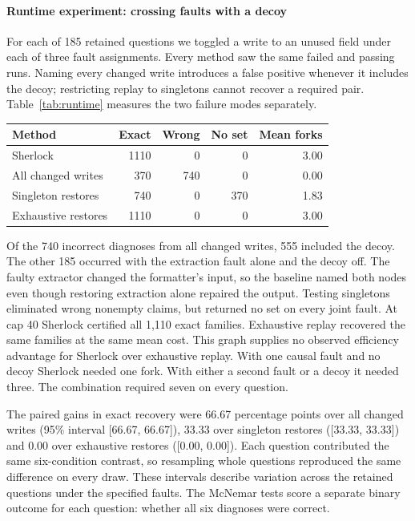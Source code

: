 \documentclass[11pt,letterpaper]{article}
\begin{document}
\paragraph{Runtime experiment: crossing faults with a decoy}\label{sec:runtime}
For each of 185 retained questions we toggled a write to an unused field under each of three fault assignments. Every method saw the same failed and passing runs. Naming every changed write introduces a false positive whenever it includes the decoy; restricting replay to singletons cannot recover a required pair. Table~\ref{tab:runtime} measures the two failure modes separately.

\begin{center}\begin{minipage}{\linewidth}\centering
{}\label{tab:runtime}
\small\begin{tabular}{lrrrr}
\toprule
Method & Exact & Wrong & No set & Mean forks \\
\midrule
Sherlock & 1110 & 0 & 0 & 3.00 \\
All changed writes & 370 & 740 & 0 & 0.00 \\
Singleton restores & 740 & 0 & 370 & 1.83 \\
Exhaustive restores & 1110 & 0 & 0 & 3.00 \\
\bottomrule\end{tabular}
\end{minipage}\end{center}

Of the 740 incorrect diagnoses from all changed writes, 555 included the decoy. The other 185 occurred with the extraction fault alone and the decoy off. The faulty extractor changed the formatter's input, so the baseline named both nodes even though restoring extraction alone repaired the output. Testing singletons eliminated wrong nonempty claims, but returned no set on every joint fault. At cap 40 Sherlock certified all 1,110 exact families. Exhaustive replay recovered the same families at the same mean cost. This graph supplies no observed efficiency advantage for Sherlock over exhaustive replay. With one causal fault and no decoy Sherlock needed one fork. With either a second fault or a decoy it needed three. The combination required seven on every question.

The paired gains in exact recovery were 66.67 percentage points over all changed writes (95\% interval [66.67, 66.67]), 33.33 over singleton restores ([33.33, 33.33]) and 0.00 over exhaustive restores ([0.00, 0.00]). Each question contributed the same six-condition contrast, so resampling whole questions reproduced the same difference on every draw. These intervals describe variation across the retained questions under the specified faults. The McNemar tests score a separate binary outcome for each question: whether all six diagnoses were correct.
\end{document}

